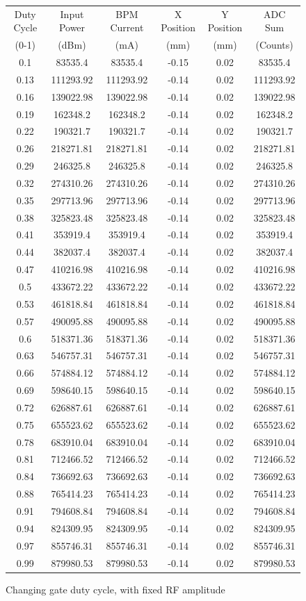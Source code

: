 \documentclass[a4paper, 11pt]{article}%
\begin{document}
%
\begin{figure}[htbp]%
\centering%
\caption{Changing gate duty cycle, with fixed RF amplitude }%
\begin{tabular}{|c|c|c|c|c|c|}%
\hline%
Duty Cycle&Input Power&BPM Current&X Position&Y Position&ADC Sum\\%
(0{-}1)&(dBm)&(mA)&(mm)&(mm)&(Counts)\\%
\hline%
0.1&83535.4&83535.4&{-}0.15&0.02&83535.4\\%
0.13&111293.92&111293.92&{-}0.14&0.02&111293.92\\%
0.16&139022.98&139022.98&{-}0.14&0.02&139022.98\\%
0.19&162348.2&162348.2&{-}0.14&0.02&162348.2\\%
0.22&190321.7&190321.7&{-}0.14&0.02&190321.7\\%
0.26&218271.81&218271.81&{-}0.14&0.02&218271.81\\%
0.29&246325.8&246325.8&{-}0.14&0.02&246325.8\\%
0.32&274310.26&274310.26&{-}0.14&0.02&274310.26\\%
0.35&297713.96&297713.96&{-}0.14&0.02&297713.96\\%
0.38&325823.48&325823.48&{-}0.14&0.02&325823.48\\%
0.41&353919.4&353919.4&{-}0.14&0.02&353919.4\\%
0.44&382037.4&382037.4&{-}0.14&0.02&382037.4\\%
0.47&410216.98&410216.98&{-}0.14&0.02&410216.98\\%
0.5&433672.22&433672.22&{-}0.14&0.02&433672.22\\%
0.53&461818.84&461818.84&{-}0.14&0.02&461818.84\\%
0.57&490095.88&490095.88&{-}0.14&0.02&490095.88\\%
0.6&518371.36&518371.36&{-}0.14&0.02&518371.36\\%
0.63&546757.31&546757.31&{-}0.14&0.02&546757.31\\%
0.66&574884.12&574884.12&{-}0.14&0.02&574884.12\\%
0.69&598640.15&598640.15&{-}0.14&0.02&598640.15\\%
0.72&626887.61&626887.61&{-}0.14&0.02&626887.61\\%
0.75&655523.62&655523.62&{-}0.14&0.02&655523.62\\%
0.78&683910.04&683910.04&{-}0.14&0.02&683910.04\\%
0.81&712466.52&712466.52&{-}0.14&0.02&712466.52\\%
0.84&736692.63&736692.63&{-}0.14&0.02&736692.63\\%
0.88&765414.23&765414.23&{-}0.14&0.02&765414.23\\%
0.91&794608.84&794608.84&{-}0.14&0.02&794608.84\\%
0.94&824309.95&824309.95&{-}0.14&0.02&824309.95\\%
0.97&855746.31&855746.31&{-}0.14&0.02&855746.31\\%
0.99&879980.53&879980.53&{-}0.14&0.02&879980.53\\%
\hline%
\end{tabular}%
\end{figure}%
\end{document}
